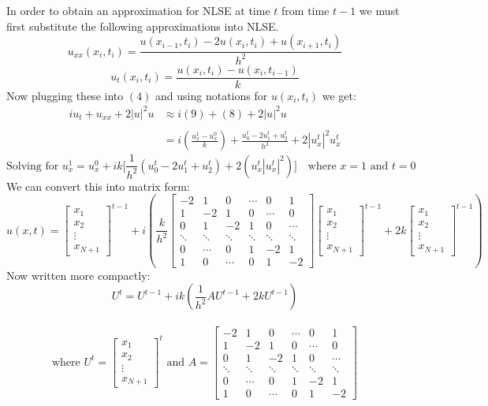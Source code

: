 \documentclass[11pt, oneside]{article}   	%
\newcommand{\Uvector}{
  \begin{bmatrix}
   x_1\\
   x_2\\
   \vdots\\
   x_{N+1}
  \end{bmatrix}}
\newcommand{\Amatrix}{
  \begin{bmatrix}
   -2 &1 &0 &\cdots &0 &1\\
   1 &-2 &1 &0 &\cdots &0\\
   0 &1 &-2 &1 &0 &\cdots\\
   \ddots &\ddots &\ddots &\ddots &\ddots &\ddots\\
   0 &\cdots &0 &1 &-2 &1\\
   1 &0 &\cdots &0 &1 &-2
  \end{bmatrix}}
\begin{document}
In order to obtain an approximation for NLSE at time $t$ from time $t-1$ we must first substitute the following approximations into NLSE. 
\begin{equation}
    u_{xx}(x_i,t_i) = \frac{u(x_{i-1},t_i) - 2u(x_i,t_i)+u(x_{i+1},t_i)}{h^2} 
\end{equation}
\begin{equation}
    u_t(x_i,t_i) = \frac{u(x_i,t_i) - u(x_i,t_{i-1})}{k}
\end{equation}
Now plugging these into $(4)$ and using notations for $u(x_i,t_i)$ we get:
\begin{align*}
    iu_t + u_{xx} + 2|u|^2u &\approx i(9) + (8) + 2|u|^2u
    \\
    \\
    &=i(\frac{u_x^1 - u_x^0}{k}) + \frac{u_0^t - 2u_1^t+u_2^t}{h^2}  + 2|u_x^t|^2u_x^t
\end{align*}
\begin{equation}
    \text{Solving for } u_x^1 = u_x^0 + ik\bigg[\frac{1}{h^2}(u_0^t - 2u_1^t+u_2^t) + 2(u_x^t|u_x^t|^2)\bigg] \quad \text{where $x=1$ and $t=0$}
\end{equation}
We can convert this into matrix form:
$$
    u(x,t) = \Uvector^{t-1}+i\left(\frac{k}{h^2}\Amatrix\Uvector^{t-1} +2k\Uvector^{t-1}\right)
$$
Now written more compactly:\\
\begin{equation}
U^t = U^{t-1} + ik(\frac{1}{h^2}AU^{t-1} + 2kU^{t-1})
\end{equation}
\\
$$
 \text{where } U^t = \Uvector^t \text{ and }A = \Amatrix
$$
\end{document}
